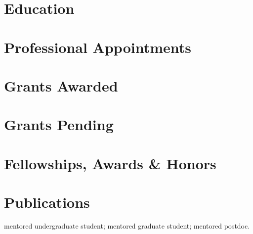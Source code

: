 


\newcommand{\longcontent}[1]{}

\newcommand{\oldcontent}[1]{}

\newcommand{\docTitle}{Curriculum Vitae\xspace}


\singlespacing



\section*{Education}


\section*{Professional Appointments}


% 

% 

\section*{Grants Awarded}


\section*{Grants Pending}


\section*{Fellowships, Awards \& Honors}


\section*{Publications}
\ugsymbol{}mentored undergraduate student;
\phdsymbol{}mentored graduate student;
\postdocsymbol{}mentored postdoc.

